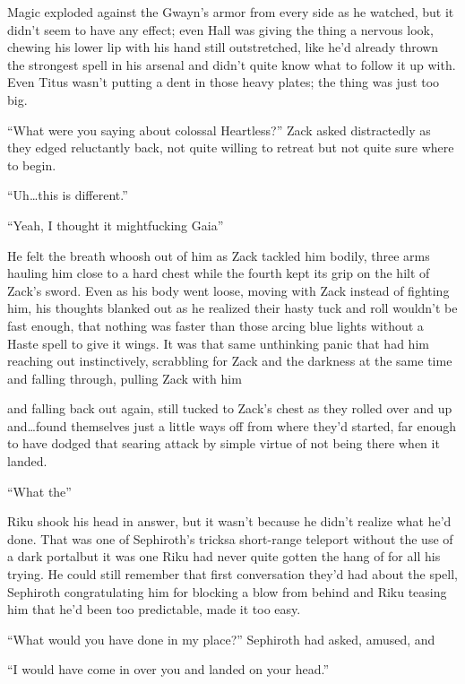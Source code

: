 Magic exploded against the Gwayn's armor from every side as he watched, but it didn't seem to have any effect; even Hall was giving the thing a nervous look, chewing his lower lip with his hand still outstretched, like he'd already thrown the strongest spell in his arsenal and didn't quite know what to follow it up with. Even Titus wasn't putting a dent in those heavy plates; the thing was just too big.

``What were you saying about colossal Heartless?'' Zack asked distractedly as they edged reluctantly back, not quite willing to retreat but not quite sure where to begin.

``Uh\ldots this is different.''

``Yeah, I thought it might\textemdash fucking Gaia\textemdash''

He felt the breath whoosh out of him as Zack tackled him bodily, three arms hauling him close to a hard chest while the fourth kept its grip on the hilt of Zack's sword. Even as his body went loose, moving with Zack instead of fighting him, his thoughts blanked out as he realized their hasty tuck and roll wouldn't be fast enough, that nothing was faster than those arcing blue lights without a Haste spell to give it wings. It was that same unthinking panic that had him reaching out instinctively, scrabbling for Zack and the darkness at the same time and falling through, pulling Zack with him\textemdash 

\textemdash and falling back out again, still tucked to Zack's chest as they rolled over and up and\ldots found themselves just a little ways off from where they'd started, far enough to have dodged that searing attack by simple virtue of not being there when it landed.

``What the\textemdash''

Riku shook his head in answer, but it wasn't because he didn't realize what he'd done. That was one of Sephiroth's tricks\textemdash a short-range teleport without the use of a dark portal\textemdash but it was one Riku had never quite gotten the hang of for all his trying. He could still remember that first conversation they'd had about the spell, Sephiroth congratulating him for blocking a blow from behind and Riku teasing him that he'd been too predictable, made it too easy.

``What would you have done in my place?'' Sephiroth had asked, amused, and\textemdash 

``I would have come in over you and landed on your head.''

